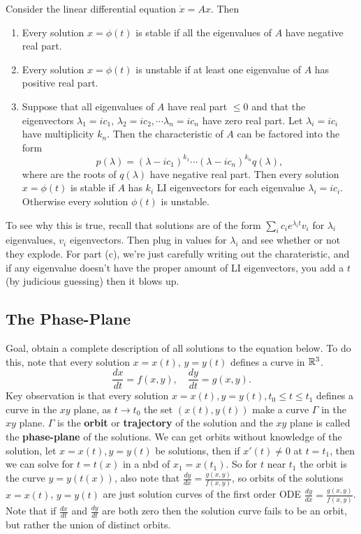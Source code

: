 \begin{theorem}
    Consider the linear differential equation $\dot x=Ax$. Then 
    \begin{enumerate}[label=(\alph*)]
        \item Every solution $x=\phi(t)$ is stable if all the eigenvalues of $A$ have negative real part.
        \item Every solution $x=\phi(t)$ is unstable if at least one eigenvalue of $A$ has positive real part.
        \item Suppose that all eigenvalues of $A$ have real part $\leq 0$ and  that the eigenvectors $\lambda_1=ic_1,\, \lambda_2=ic_2, \cdots \lambda_n =ic_n $ have zero real part. Let $\lambda_i =ic_i $ have multiplicity $k_n $. Then the characteristic of $A$ can be factored into the form \[
                p(\lambda)=(\lambda-ic_1)^{k_1}\cdots (\lambda-ic_n )^{k_n }q(\lambda),
            \] where are the roots of $q(\lambda)$ have negative real part. Then every solution $x=\phi(t)$ is stable if $A$ has $k_i $ LI eigenvectors for each eigenvalue $\lambda_i =ic_i $. Otherwise every solution $\phi(t)$ is unstable.
    \end{enumerate}
\end{theorem}
To see why this is true, recall that solutions are of the form $\sum_{i}^{} c_i e^{\lambda_i t}v_i $ for $\lambda_i $ eigenvalues, $v_i $ eigenvectors. Then plug in values for $\lambda_i $ and see whether or not they explode. For part (c), we're just carefully writing out the charateristic, and if any eigenvalue doesn't have the proper amount of LI eigenvectors, you add a $t$ (by judicious guessing) then it blows up.

\subsection{The Phase-Plane}
Goal, obtain a complete description of all solutions to the equation below. To do this, note that every solution $x=x(t),\, y=y(t)$ defines a curve in $\mathbb{R}^3$. \[
    \frac{dx}{dt}=f(x,y),\quad \frac{dy}{dt}=g(x,y).
\] Key observation is that every solution $x=x(t),y=y(t),t_0\leq t\leq t_1$ defines a curve in the $xy$ plane, as $t \to t_0$ the set $(x(t),y(t))$ make a curve $\Gamma $ in the $xy$ plane. $\Gamma $ is the \textbf{orbit} or \textbf{trajectory} of the solution and the $xy$ plane is called the \textbf{phase-plane} of the solutions. We can get orbits without knowledge of the solution, let $x=x(t),y=y(t)$ be solutions, then if $x'(t)\neq 0$ at $t=t_1$, then we can solve for $t=t(x)$ in a nbd of $x_1=x(t_1)$. So for $t$ near $t_1$ the orbit is the curve $y=y(t(x))$, also note that $\frac{dy}{dx}=\frac{g(x,y)}{f(x,y)}$, so orbits of the solutions $x=x(t) $, $y=y(t)$ are just solution curves of the first order ODE $\frac{dy}{dx}=\frac{g(x,y)}{f(x,y)}$. Note that if $\frac{dx}{dt}$ and $\frac{dy}{dt}$ are both zero then the solution curve fails to be an orbit, but rather the union of distinct orbits.

